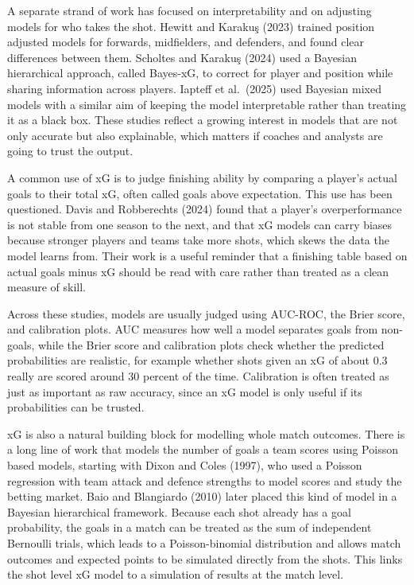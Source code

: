 \documentclass[11pt]{article}
\begin{document}
A separate strand of work has focused on interpretability and on adjusting
models for who takes the shot. Hewitt and Karaku\c{s} (2023) trained position
adjusted models for forwards, midfielders, and defenders, and found clear
differences between them. Scholtes and Karaku\c{s} (2024) used a Bayesian
hierarchical approach, called Bayes-xG, to correct for player and position while
sharing information across players. Iapteff et al.\ (2025) used Bayesian mixed
models with a similar aim of keeping the model interpretable rather than
treating it as a black box. These studies reflect a growing interest in models
that are not only accurate but also explainable, which matters if coaches and
analysts are going to trust the output.

A common use of xG is to judge finishing ability by comparing a player's actual
goals to their total xG, often called goals above expectation. This use has been
questioned. Davis and Robberechts (2024) found that a player's overperformance
is not stable from one season to the next, and that xG models can carry biases
because stronger players and teams take more shots, which skews the data the
model learns from. Their work is a useful reminder that a finishing table based
on actual goals minus xG should be read with care rather than treated as a clean
measure of skill.

Across these studies, models are usually judged using AUC-ROC, the Brier score,
and calibration plots. AUC measures how well a model separates goals from
non-goals, while the Brier score and calibration plots check whether the
predicted probabilities are realistic, for example whether shots given an xG of
about 0.3 really are scored around 30 percent of the time. Calibration is often
treated as just as important as raw accuracy, since an xG model is only useful if
its probabilities can be trusted.

xG is also a natural building block for modelling whole match outcomes. There is
a long line of work that models the number of goals a team scores using Poisson
based models, starting with Dixon and Coles (1997), who used a Poisson
regression with team attack and defence strengths to model scores and study the
betting market. Baio and Blangiardo (2010) later placed this kind of model in a
Bayesian hierarchical framework. Because each shot already has a goal
probability, the goals in a match can be treated as the sum of independent
Bernoulli trials, which leads to a Poisson-binomial distribution and allows
match outcomes and expected points to be simulated directly from the shots. This
links the shot level xG model to a simulation of results at the match level.
\end{document}
